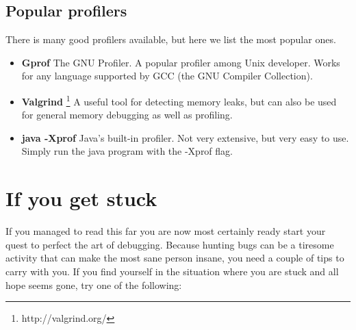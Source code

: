 \documentclass[11pt,a4paper,twoside]{article}
\begin{document}
\subsection{Popular profilers}
There is many good profilers available, but here we list the most popular ones.
\begin{itemize}
    \item \textbf{Gprof} 
    The GNU Profiler. A popular profiler among Unix developer.  Works for any
    language supported by GCC (the GNU Compiler Collection).

    \item \textbf{Valgrind} \footnote{http://valgrind.org/} 
    A useful tool for detecting memory leaks, but can also be used for general
    memory debugging as well as profiling.

    \item \textbf{java -Xprof} 
    Java's built-in profiler. Not very extensive, but very easy to use.  Simply
    run the java program with the -Xprof flag.

\end{itemize}

\section{If you get stuck}

If you managed to read this far you are now most certainly ready start your
quest to perfect the art of debugging. Because hunting bugs can be a tiresome
activity that can make the most sane person insane, you need a couple of tips
to carry with you. If you find yourself in the situation where you are stuck
and all hope seems gone, try one of the following: 
\end{document}
